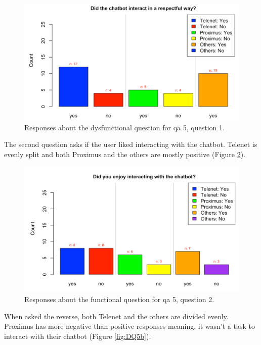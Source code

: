 \begin{figure}[!htb]
	\includegraphics[width=\linewidth, scale=0.5]{../LaTeX/Figures/Comparative/DQ5.png}
	\caption{Responses about the dysfunctional question for \acrshort{qa} 5, question 1.}\label{fig:DQ5}
\end{figure}
\break
The second question asks if the user liked interacting with the chatbot. Telenet is evenly split and both Proximus and the others are mostly positive (Figure \ref{fig:Q5b}).\\
\begin{figure}[!htb]
	\includegraphics[width=\linewidth, scale=0.5]{../LaTeX/Figures/Comparative/Q5b.png}
	\caption{Responses about the functional question for \acrshort{qa} 5, question 2.}\label{fig:Q5b}
\end{figure}
When asked the reverse, both Telenet and the others are divided evenly. Proximus has more negative than positive responses meaning, it wasn't a task to interact with their chatbot (Figure \ref{fig:DQ5b}).\\
